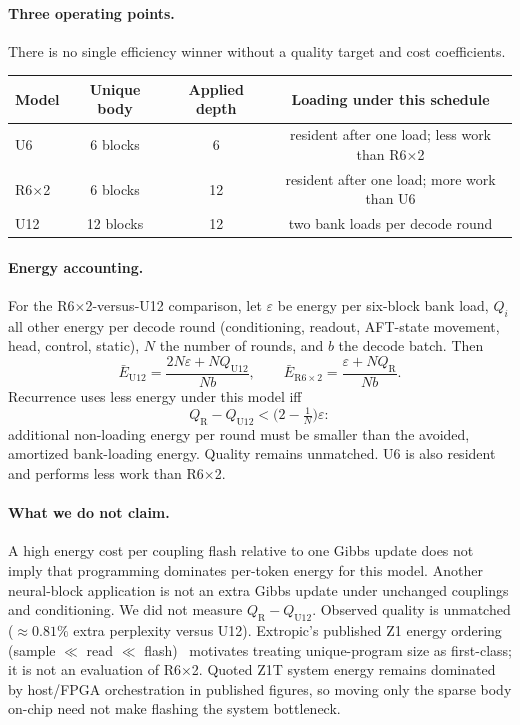 \documentclass{article}
\begin{document}
\paragraph{Three operating points.}
There is no single efficiency winner without a quality target and cost coefficients.

\begin{center}
\begin{tabular}{lccc}
\toprule
Model & Unique body & Applied depth & Loading under this schedule \\
\midrule
U6 & 6 blocks & 6 & resident after one load; less work than R6$\times$2 \\
R6$\times$2 & 6 blocks & 12 & resident after one load; more work than U6 \\
U12 & 12 blocks & 12 & two bank loads per decode round \\
\bottomrule
\end{tabular}
\end{center}

\paragraph{Energy accounting.}
For the R6$\times$2-versus-U12 comparison, let \(\varepsilon\) be energy per six-block bank load, \(Q_i\) all other energy per decode round (conditioning, readout, AFT-state movement, head, control, static), \(N\) the number of rounds, and \(b\) the decode batch. Then
\[
\bar E_{\mathrm{U12}} = \frac{2N\varepsilon + N Q_{\mathrm{U12}}}{Nb},
\qquad
\bar E_{\mathrm{R6}\times 2} = \frac{\varepsilon + N Q_{\mathrm{R}}}{Nb}.
\]
Recurrence uses less energy under this model iff
\[
Q_{\mathrm{R}}-Q_{\mathrm{U12}} < \bigl(2-\tfrac{1}{N}\bigr)\varepsilon:
\]
additional non-loading energy per round must be smaller than the avoided, amortized bank-loading energy. Quality remains unmatched. U6 is also resident and performs less work than R6$\times$2.

\paragraph{What we do not claim.}
A high energy cost per coupling flash relative to one Gibbs update does not imply that programming dominates per-token energy for this model. Another neural-block application is not an extra Gibbs update under unchanged couplings and conditioning. We did not measure \(Q_{\mathrm{R}}-Q_{\mathrm{U12}}\). Observed quality is unmatched ($\approx 0.81\%$ extra perplexity versus U12). Extropic's published Z1 energy ordering (sample $\ll$ read $\ll$ flash)~\cite{amico2026} motivates treating unique-program size as first-class; it is not an evaluation of R6$\times$2. Quoted Z1T system energy remains dominated by host/FPGA orchestration in published figures, so moving only the sparse body on-chip need not make flashing the system bottleneck.
\end{document}
